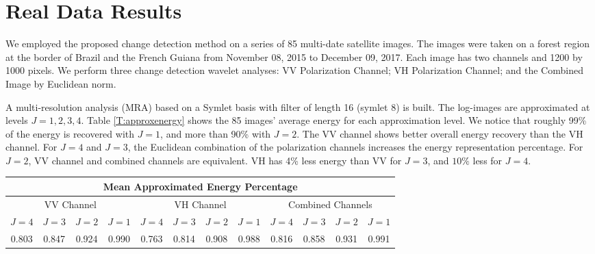 \documentclass[journal]{IEEEtran}
\begin{document}
\section{Real Data Results}\label{section_realdata}

We employed the proposed change detection method on a series of 85 multi-date satellite images. The images were taken on a forest region at the border of Brazil and the French Guiana from November 08, 2015 to December 09, 2017. Each image has two channels and 1200 by 1000 pixels. We perform three change detection wavelet analyses: VV Polarization Channel;  VH Polarization Channel; and the Combined Image by Euclidean norm. 

A multi-resolution analysis (MRA) based on a Symlet basis with filter of length 16 (symlet 8) is built.  The log-images are approximated at levels $J=1,2,3,4$. Table \ref{T:approxenergy} shows the 85 images' average energy for each approximation level. We notice that roughly 99\% of the energy is recovered with $J=1$, and more than  90\% with $J=2$. The VV channel shows better overall energy recovery than the VH channel. For $J=4$ and $J=3$, the Euclidean combination of the polarization channels increases the energy representation percentage.  For $J=2$, VV channel and combined channels are equivalent. VH has 4\% less energy than VV for $J=3$, and $10\%$ less  for $J=4$.

\begin{table*}[h!]
\caption{Wavelet Approximation Mean Energy Percentage for log-images. Forest region at the border of Brazil and the French Guiana from November 08, 2015 to December 09, 2017. $n=85$ multi-date satellite images. Each image has two channels and 1200 by 1000 pixels. VV Polarization Channel;  VH Polarization Channel; and the Combined Image by Euclidean norm. Approximation $J=1,2,3,4$.}
\centering
\begin{tabular}{cccc|cccc|cccc}
\hline
\multicolumn{12}{c}{\sc Mean Approximated Energy Percentage}\\
\hline
\multicolumn{4}{c|}{VV Channel}&\multicolumn{4}{c|}{VH Channel}&\multicolumn{4}{c}{Combined Channels}\\
\hline
$J=4$&$J=3$&$J=2$&$J=1$&$J=4$&$J=3$&$J=2$&$J=1$&$J=4$&$J=3$&$J=2$&$J=1$\\
\hline
0.803&0.847&0.924&0.990&0.763&0.814&0.908&0.988&0.816&0.858&0.931&0.991\\
\hline
\end{tabular}\label{T:approxenergy}
\end{table*}
\end{document}
